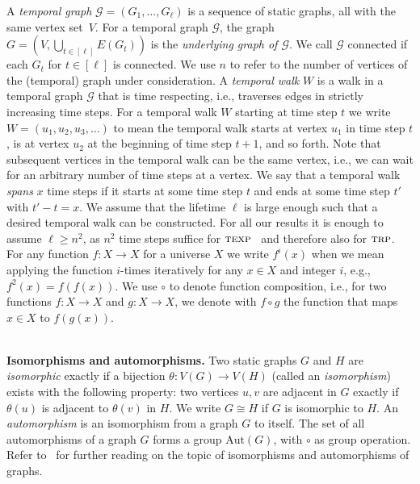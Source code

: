 \documentclass[10pt,a4paper]{article}
\newcommand{\trp}{\textsc{trp}}
\newcommand{\texp}{\textsc{texp}}
\newcommand{\autg}{\ensuremath{\text{Aut}(G)}}
\begin{document}
A \textit{temporal graph} $\mathcal{G}=(G_1, \ldots, G_{\ell})$ is a sequence of
static graphs, all with the same vertex set~$V$. For a temporal graph
$\mathcal{G}$, the graph $G=(V, \bigcup_{t \in [\ell]} E(G_t))$ is the
\textit{underlying graph of $\mathcal{G}$}. We call $\mathcal{G}$ connected if
each $G_t$ for $t\in [\ell]$ is connected. We use $n$ to refer to the number of
vertices of the (temporal) graph under consideration. A \textit{temporal walk}
$W$ is a walk in a temporal graph $\mathcal{G}$ that is time respecting, i.e.,
traverses edges in strictly increasing time steps. For a temporal walk $W$
starting at time step $t$ we write $W=(u_1, u_2, u_3, \ldots)$ to mean the
temporal walk starts at vertex $u_1$ in time step $t$, {is at vertex $u_2$
at the beginning of time step $t+1$,} and so forth. Note that subsequent
vertices in the temporal walk can be the same vertex, i.e., we can wait for an
arbitrary number of time steps at a vertex. We say that a temporal walk
\emph{spans} $x$ time steps if it starts at some time step $t$ and ends at some
time step $t'$ with $t'-t=x$. 
We assume that the lifetime $\ell$ is large enough
such that a desired temporal walk can be constructed. {For all our results
it is enough to assume $\ell \ge n^2$, as $n^2$ time steps suffice for
$\texp$~\cite{ErlebachHK21} and therefore also for $\trp$.} For any function $f:
X \rightarrow X$ for a universe $X$ we write $f^i(x)$ when we mean applying the
function $i$-times iteratively for any $x \in X$ and integer $i$, e.g.,
$f^2(x)=f(f(x))$. {We use $\circ$ to denote function composition, i.e.,}
for two functions $f: X \rightarrow X$ and $g: X \rightarrow X$, we denote with
$f \circ g$ the function that maps $x\in X$ to $f(g(x))$.


~\\ \noindent \textbf{Isomorphisms and automorphisms.} Two static graphs $G$ and $H$ are
\textit{isomorphic} exactly if a bijection $\theta: V(G) \rightarrow V(H)$
(called an \textit{isomorphism}) exists with the following property: two
vertices $u, v$ are adjacent in $G$ exactly if $\theta(u)$ is adjacent to
$\theta(v)$ in $H$. We write $G\cong H$ if $G$ is isomorphic to $H$. An
\textit{automorphism} is an isomorphism from a graph $G$ to itself. The set of
all automorphisms of a graph $G$ {forms a group $\autg$, with $\circ$ as
group operation.} Refer to~\cite{GodsilR01,KnauerK19,LauriS16} for further reading on the topic
of isomorphisms and automorphisms of graphs.
\end{document}

